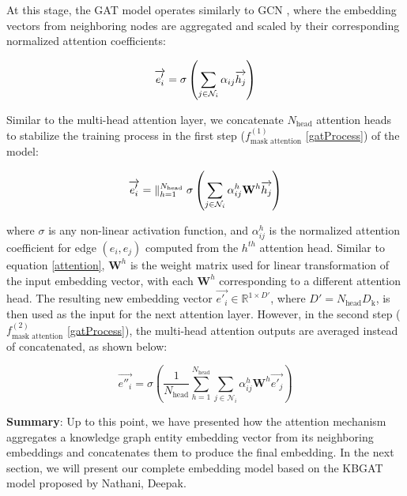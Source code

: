 At this stage, the GAT model operates similarly to GCN \cite{kipf2016semi}, where the embedding vectors from neighboring nodes are aggregated and scaled by their corresponding normalized attention coefficients:

\begin{equation}
	\label{scaleAttentionCoef}
	\centering
	{\overrightarrow{e'_i}}={\sigma\left(\sum_{j\in \mathcal{N}_i} {\alpha_{ij} \overrightarrow{h_j} }\right)}
\end{equation}

Similar to the multi-head attention layer, we concatenate $N_{\text{head}}$ attention heads to stabilize the training process in the first step ($f_{\text{mask attention}}^{(1)}$ \ref{gatProcess}) of the model:

\begin{equation}
	\label{multiHeadAttention}
	{\overrightarrow{e'_i}}={\bigparallel_{h=1}^{N_{\text{head}}}\sigma\left(\sum_{j\in \mathcal{N}_i}\alpha_{ij}^{h} \mathbf{W}^{h} \overrightarrow{h_{j}} \right)}
\end{equation}

where $\sigma$ is any non-linear activation function, and $\alpha_{ij}^h$ is the normalized attention coefficient for edge $(e_i, e_j)$ computed from the $h^{th}$ attention head. Similar to equation \ref{attention}, $\mathbf{W}^h$ is the weight matrix used for linear transformation of the input embedding vector, with each $\mathbf{W}^h$ corresponding to a different attention head. The resulting new embedding vector $\overrightarrow{e'_i} \in \mathbb{R}^{1 \times D'}$, where $D' = N_{\text{head}} D_{\text{k}}$, is then used as the input for the next attention layer. However, in the second step ($f_{\text{mask attention}}^{(2)}$ \ref{gatProcess}), the multi-head attention outputs are averaged instead of concatenated, as shown below:

\begin{equation}
	\label{multiHeadConcat}
	{\overrightarrow{e''_i}}={\sigma\left(\frac{1}{N_{\text{head}}} \sum_{h=1}^{N_{\text{head}}}\sum_{j\in \mathcal{N}_i}\alpha_{ij}^{h} \mathbf{W}^{h} \overrightarrow{e'_{j}} \right)}
\end{equation}



\textbf{Summary}: Up to this point, we have presented how the attention mechanism aggregates a knowledge graph entity embedding vector from its neighboring embeddings and concatenates them to produce the final embedding. In the next section, we will present our complete embedding model based on the KBGAT model proposed by Nathani, Deepak\cite{nathani2019learning}.

